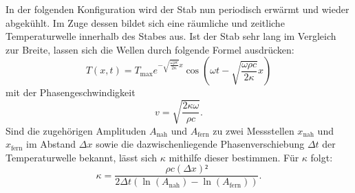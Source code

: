 In der folgenden Konfiguration wird der Stab nun periodisch erwärmt und
 wieder abgekühlt.
 Im Zuge dessen bildet sich eine räumliche und zeitliche Temperaturwelle
  innerhalb des Stabes aus. Ist der Stab sehr lang im Vergleich zur Breite, lassen
   sich die Wellen durch folgende Formel ausdrücken:
  \begin{equation}
    T(x,t) = T_\text{max}e^{-\sqrt{{\frac{\omega \rho c}{2\kappa}}}x}\cos \left( \omega t - \sqrt{\frac{\omega \rho c}{2\kappa}}x \right)\label{eq:form5}
  \end{equation}
mit der Phasengeschwindigkeit
\begin{equation}
  v = \sqrt{\frac{2 \kappa \omega}{\rho c}}\text{.}\label{eq:form6}
\end{equation}
Sind die zugehörigen Amplituden $A_\text{nah}$ und $A_\text{fern}$ zu zwei Messstellen
$x_\text{nah}$ und $x_\text{fern}$ im Abstand $\Delta x$ sowie die dazwischenliegende Phasenverschiebung $\Delta t$
 der Temperaturwelle bekannt, lässt sich $\kappa$ mithilfe dieser bestimmen. Für $\kappa$ folgt:
 \begin{equation}
   \kappa = \frac{\rho c (\Delta x)²}{2 \Delta t (\ln(A_\text{nah})-\ln(A_\text{fern}))}\text{.}\label{eq:form7}
 \end{equation}
